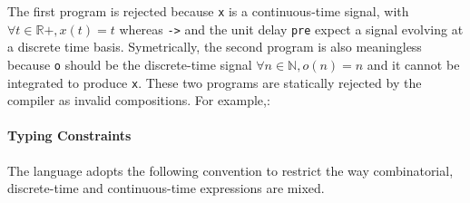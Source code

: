 \documentclass[11pt,titlepage,twoside]{report}
\newcommand{\bR}{\mathbb{R}}
\newcommand{\bN}{\mathbb{N}}
\begin{document}
The first program is rejected because \texttt{x} is a continuous-time
signal, with $\forall t \in \bR+, x(t) = t$ whereas \texttt{->} and
the unit delay \texttt{pre} expect a signal evolving at a discrete
time basis. Symetrically, the second program is also meaningless
because \verb-o- should be the discrete-time signal $\forall n \in
\bN, o(n) = n$ and it cannot be integrated to produce \verb-x-.
These two programs
are statically rejected by the compiler as invalid
compositions. For example,: \chklistingerr{}

\paragraph{Typing Constraints}

\newcommand{\AnyKind}{\mathtt{A}}
\newcommand{\NodeKind}{\mathtt{D}}
\newcommand{\HybridKind}{\mathtt{C}}

The language adopts the following convention to restrict the
way combinatorial, discrete-time and continuous-time expressions are mixed.
\end{document}
